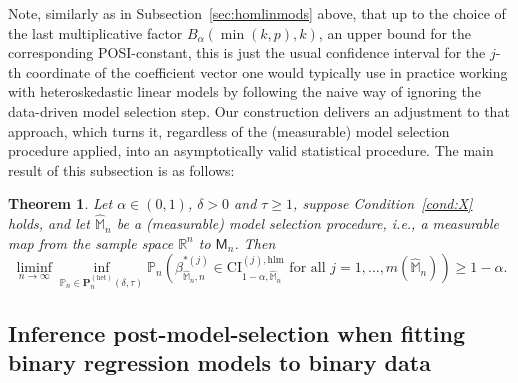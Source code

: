 \documentclass[preprint]{imsart}
\newcommand{\R}{{\mathbb R}}
\newtheorem{theorem}{Theorem}[section]
\numberwithin{equation}{section}
\begin{document}
Note, similarly as in Subsection~\ref{sec:homlinmods} above, that up to the choice of the last multiplicative factor $B_{\alpha}(\min(k, p),k)$, an upper bound for the corresponding POSI-constant, this is just the usual confidence interval for the $j$-th coordinate of the coefficient vector one would typically use in practice working with heteroskedastic linear models by following the naive way of ignoring the data-driven model selection step. Our construction delivers an adjustment to that approach, which turns it, regardless of the (measurable) model selection procedure applied, into an asymptotically valid statistical procedure. The main result of this subsection is as follows:
%
\begin{theorem}\label{thm:hetlinmods}
Let $\alpha \in (0, 1)$, $\delta > 0$ and $\tau \ge 1$, suppose Condition~\ref{cond:X} holds, and let $\hat{\mathbb{M}}_n$ be a (measurable) model selection procedure, i.e., a measurable map from the sample space $\R^n$ to $\mathsf{M}_n$. Then
%
\begin{equation*}
\liminf_{n \to \infty} \inf_{\mathbb{P}_n \in \mathbf{P}_n^{(\mathrm{het})} 
\left(\delta, \tau \right) } \mathbb{P}_n \left(\beta_{\hat{\mathbb{M}}_n, n}^{* (j)} \in \mathrm{CI}_{1-\alpha, \hat{\mathbb{M}}_n}^{(j), \mathrm{hlm}} \text{ for all } j = 1, \hdots, m(\hat{\mathbb{M}}_n)  \right) \geq 1-\alpha.
\end{equation*}
%
\end{theorem}



\subsection{Inference post-model-selection when fitting binary regression models to binary data}
\label{sec:binary}
\end{document}
